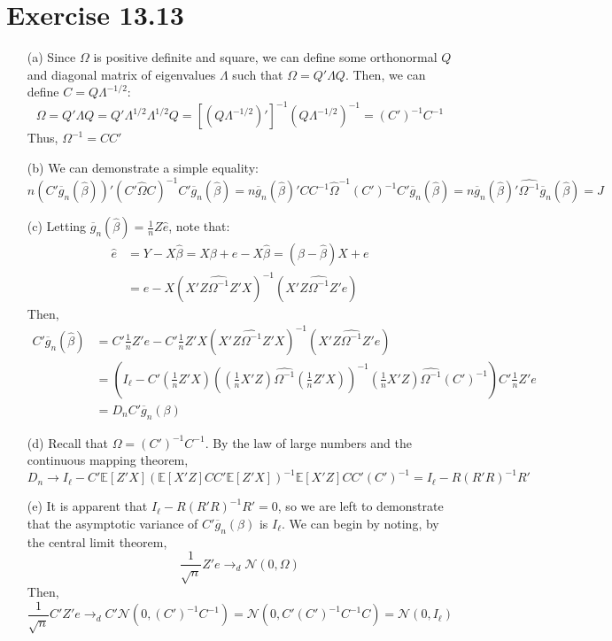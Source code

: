 \documentclass{article}
\newcommand{\N}{\mathcal{N}}
\newcommand{\bhat}{\hat{\beta}}
\newcommand{\oinv}{\Omega^{-1}}
\newcommand{\olg}{\overline{g}_n}
\newcommand{\E}[1]{\mathbb{E}\left[#1\right]}%
\begin{document}
\pagebreak
\section*{Exercise 13.13}

\begin{itemize}
	\item[(a)] Since $\Omega$ is positive definite and square, we can define some orthonormal $Q$ and diagonal matrix of eigenvalues $\Lambda$ such that ${\Omega=Q'\Lambda Q}$. Then, we can define ${C=Q\Lambda^{-1/2}}$:
		\[
			\Omega = Q'\Lambda Q = Q'\Lambda^{1/2}\Lambda^{1/2}Q = [(Q\Lambda^{-1/2})']^{-1}(Q\Lambda^{-1/2})^{-1} = (C')^{-1}C^{-1}
		\]
		Thus, ${\oinv=CC'}$
	
	
	\item[(b)] We can demonstrate a simple equality: {\small $$ n\left(C'\olg(\bhat)\right)'\left(C'\hat{\Omega}C\right)^{-1}C'\olg(\bhat) = n\olg(\bhat)'CC^{-1}\hat{\Omega}^{-1}(C')^{-1}C'\olg(\bhat) = n\olg(\bhat)'\hat{\oinv}\olg(\bhat) = J $$}
	
	
	\item[(c)] Letting ${\olg(\bhat)=\frac{1}{n}Z\hat{e}}$, note that:
		\begin{align*}
			\hat{e} &= Y-X\bhat = X\beta + e - X\bhat = (\beta-\bhat)X + e 	\\
					&= e - X\left(X'Z\hat{\oinv}Z'X\right)^{-1}\left(X'Z\hat{\oinv}Z'e\right)
		\end{align*}
		Then, 
		{\small \begin{align*}
			C'\olg(\bhat)	&= C'\frac{1}{n}Z'e - C'\frac{1}{n}Z'X\left(X'Z\hat{\oinv}Z'X\right)^{-1}\left(X'Z\hat{\oinv}Z'e\right)	\\
							&= \left(I_\ell - C'\left(\frac{1}{n}Z'X\right)\left(\left(\frac{1}{n}X'Z\right)\hat{\oinv}\left(\frac{1}{n}Z'X\right)\right)^{-1}\left(\frac{1}{n}X'Z\right)\hat{\oinv}(C')^{-1}\right)C'\frac{1}{n}Z'e	\\
							&= D_nC'\olg(\beta)
		\end{align*} }
	
	\item[(d)] Recall that ${\Omega= (C')^{-1}C^{-1}}$. By the law of large numbers and the continuous mapping theorem, 
		{\small $$ D_n	\rightarrow I_\ell - C'\E{Z'X}\left(\E{X'Z}CC'\E{Z'X}\right)^{-1}\E{X'Z}CC'(C')^{-1}
					=I_\ell - R\left(R'R\right)^{-1}R' $$ }
	
	
	\item[(e)] It is apparent that ${I_\ell - R\left(R'R\right)^{-1}R'=0}$, so we are left to demonstrate that the asymptotic variance of $C'\olg(\beta)$ is $I_\ell$. We can begin by noting, by the central limit theorem,
		\[
			\frac{1}{\sqrt{n}}Z'e\rightarrow_d\N(0,\Omega)
		\]
		Then,
		\[
			\frac{1}{\sqrt{n}}C'Z'e \rightarrow_d C'\N\left(0,(C')^{-1}C^{-1}\right) = \N\left(0,C'(C')^{-1}C^{-1}C\right) = \N(0,I_\ell)
		\]
	

\end{itemize}
\end{document}
